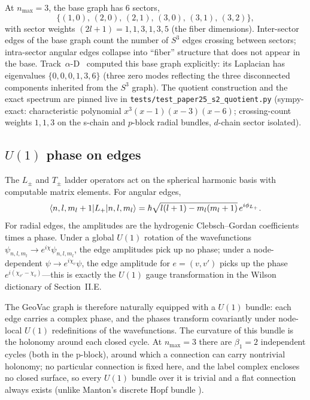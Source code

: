 \documentclass[aps,pra,twocolumn,superscriptaddress,longbibliography]{revtex4-2}
\begin{document}
At $n_{\max} = 3$, the base graph has 6 sectors,
\begin{equation}
\{(1,0),\, (2,0),\, (2,1),\, (3,0),\, (3,1),\, (3,2)\},
\label{eq:s2_sectors}
\end{equation}
with sector weights $(2l+1) = 1, 1, 3, 1, 3, 5$ (the fiber
dimensions).  Inter-sector edges of the base graph count the number
of $S^3$ edges crossing between sectors; intra-sector angular edges
collapse into ``fiber'' structure that does not appear in the base.
Track~$\alpha$-D~\cite{Paper2} computed this base graph explicitly:
its Laplacian has eigenvalues $\{0, 0, 0, 1, 3, 6\}$ (three zero
modes reflecting the three disconnected components inherited from
the $S^3$ graph).  The quotient construction and the exact spectrum
are pinned live in \texttt{tests/test\_paper25\_s2\_quotient.py}
(sympy-exact: characteristic polynomial $x^3(x-1)(x-3)(x-6)$;
crossing-count weights $1, 1, 3$ on the s-chain and $p$-block radial
bundles, $d$-chain sector isolated).

\subsection{$U(1)$ phase on edges}

The $L_\pm$ and $T_\pm$ ladder operators act on the spherical
harmonic basis with computable matrix elements.  For angular edges,
\begin{equation}
\braket{n, l, m_l + 1 | L_+ | n, l, m_l}
= \hbar \sqrt{l(l+1) - m_l(m_l+1)} \, e^{i\phi_{L_+}}.
\label{eq:Lplus}
\end{equation}
For radial edges, the amplitudes are the hydrogenic Clebsch--Gordan
coefficients times a phase.  Under a global $U(1)$ rotation of the
wavefunctions $\psi_{n,l,m_l} \to e^{i\chi}\psi_{n,l,m_l}$, the edge
amplitudes pick up no phase; under a node-dependent
$\psi \to e^{i\chi_v}\psi$, the edge amplitude for $e = (v, v')$ picks
up the phase $e^{i(\chi_{v'} - \chi_v)}$---this is exactly the
$U(1)$ gauge transformation in the Wilson dictionary of Section~II.E.

The GeoVac graph is therefore naturally equipped with a $U(1)$ bundle:
each edge carries a complex phase, and the phases transform
covariantly under node-local $U(1)$ redefinitions of the wavefunctions.
The curvature of this bundle is the holonomy around each closed
cycle.  At $n_{\max} = 3$ there are $\beta_1 = 2$ independent cycles
(both in the p-block), around which a connection can carry nontrivial
holonomy; no particular connection is fixed here, and the label complex
encloses no closed surface, so every $U(1)$ bundle over it is trivial
and a flat connection always exists (unlike Manton's discrete Hopf
bundle \cite{manton1987}).
\end{document}
